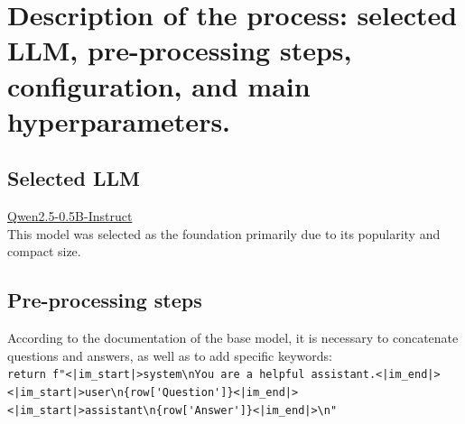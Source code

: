 \documentclass{cpsc202}
\begin{document}
    \section{Description of the process: selected LLM, pre-processing steps, configuration, and main hyperparameters.}

    \subsection{Selected LLM}
    \href{https://huggingface.co/Qwen/Qwen2.5-0.5B-Instruct}{Qwen2.5-0.5B-Instruct}\\
    This model was selected as the foundation primarily due to its popularity and compact size.

    \subsection{Pre-processing steps}
    According to the documentation of the base model, it is necessary to concatenate questions and answers, as well as to add specific keywords:\\
    \lstinline!return f"<|im_start|>system\nYou are a helpful assistant.<|im_end|>!\\
    \lstinline!<|im_start|>user\n{row['Question']}<|im_end|>!\\
    \lstinline!<|im_start|>assistant\n{row['Answer']}<|im_end|>\n"!
\end{document}
